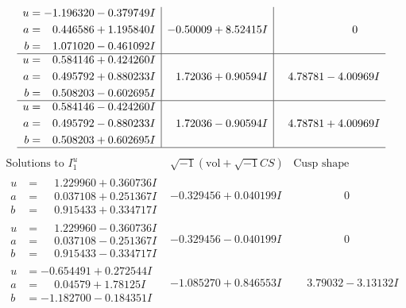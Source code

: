 \documentclass[1p]{elsarticle_modified}
\theoremstyle{definition}
\newcommand{\I}{\sqrt{-1}}
\begin{document}
$$\begin{array}{c|c|c}
\begin{aligned}
u &= -1.196320 - 0.379749 I \\
a &= \phantom{-}0.446586 + 1.195840 I \\
b &= \phantom{-}1.071020 - 0.461092 I\end{aligned}
 & -0.50009 + 8.52415 I & \phantom{-0.000000 } 0 \\ \hline\begin{aligned}
u &= \phantom{-}0.584146 + 0.424260 I \\
a &= \phantom{-}0.495792 + 0.880233 I \\
b &= \phantom{-}0.508203 - 0.602695 I\end{aligned}
 & \phantom{-}1.72036 + 0.90594 I & \phantom{-}4.78781 - 4.00969 I \\ \hline\begin{aligned}
u &= \phantom{-}0.584146 - 0.424260 I \\
a &= \phantom{-}0.495792 - 0.880233 I \\
b &= \phantom{-}0.508203 + 0.602695 I\end{aligned}
 & \phantom{-}1.72036 - 0.90594 I & \phantom{-}4.78781 + 4.00969 I\\
 \hline 
 \end{array}$$\newpage$$\begin{array}{c|c|c}  
\text{Solutions to }I^u_{1}& \I (\text{vol} + \sqrt{-1}CS) & \text{Cusp shape}\\
 \hline 
\begin{aligned}
u &= \phantom{-}1.229960 + 0.360736 I \\
a &= \phantom{-}0.037108 + 0.251367 I \\
b &= \phantom{-}0.915433 + 0.334717 I\end{aligned}
 & -0.329456 + 0.040199 I & \phantom{-0.000000 } 0 \\ \hline\begin{aligned}
u &= \phantom{-}1.229960 - 0.360736 I \\
a &= \phantom{-}0.037108 - 0.251367 I \\
b &= \phantom{-}0.915433 - 0.334717 I\end{aligned}
 & -0.329456 - 0.040199 I & \phantom{-0.000000 } 0 \\ \hline\begin{aligned}
u &= -0.654491 + 0.272544 I \\
a &= \phantom{-}0.04579 + 1.78125 I \\
b &= -1.182700 - 0.184351 I\end{aligned}
 & -1.085270 + 0.846553 I & \phantom{-}3.79032 - 3.13132 I \\ \hline\begin{aligned}

\end{aligned}
\end{array}$$
\end{document}
